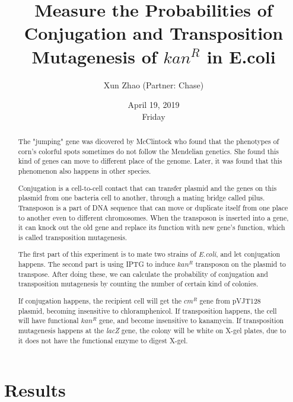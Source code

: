\documentclass{article}
\title{\bf{Measure the Probabilities of Conjugation and Transposition Mutagenesis of }$kan^R$ \bf{in E.coli}}
\author{Xun Zhao (Partner: Chase)}
\date{April 19, 2019\\Friday}
\begin{document}
    \begin{titlepage}
        \maketitle
        \setcounter{page}{0}
        \thispagestyle{empty}
    \end{titlepage}

    \renewcommand{\abstractname}{Introduction}
    \begin{abstract}
		The "jumping" gene was dicovered by McClintock who found that the phenotypes of corn's colorful spots sometimes do not follow the Mendelian genetics. She found this kind of genes can move to different place of the genome. Later, it was found that this phenomenon also happens in other species. 
		
		Conjugation is a cell-to-cell contact that can transfer plasmid and the genes on this plasmid from one bacteria cell to another, through a mating bridge called pilus. Transposon is a part of DNA sequence that can move or duplicate itself from one place to another even to different chromosomes. When the transposon is inserted into a gene, it can knock out the old gene and replace its function with new gene's function, which is called transposition mutagenesis.

		The first part of this experiment is to mate two strains of \emph{E.coli}, and let conjugation happens. The second part is using IPTG to induce $kan^R$ transposon on the plasmid to transpose. After doing these, we can calculate the probability of conjugation and transposition mutagenesis by counting the number of certain kind of colonies.

		If conjugation happens, the recipient cell will get the $cm^R$ gene from pVJT128 plasmid, becoming insensitive to chloramphenicol. If transposition happens, the cell will have functional $kan^R$ gene, and become insensitive to kanamycin. If transposition mutagenesis happens at the \emph{lacZ} gene, the colony will be white on X-gel plates, due to it does not have the functional enzyme to digest X-gel.
	\end{abstract}

	\section{Results}
\end{document}
